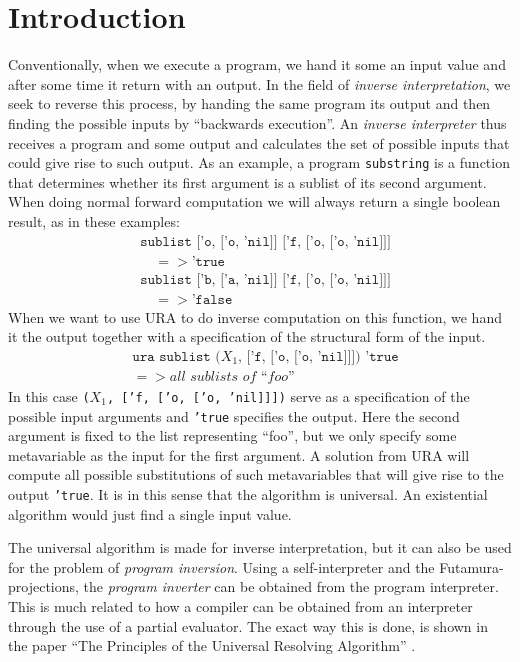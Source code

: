 \documentclass[10pt]{../sigplanconf}
\begin{document}
\newpage
\section{Introduction}
Conventionally, when we execute a program, we hand it some an input
value and after some time it return with an output. In the field of
\textit{inverse interpretation}, we seek to reverse this process, by
handing the same program its output and then finding the possible
inputs by ``backwards execution''. An \textit{inverse interpreter}
thus receives a program and some output and calculates the set of
possible inputs that could give rise to such output. As an example, a
program \texttt{substring} is a function that determines whether its
first argument is a sublist of its second argument. When doing normal
forward computation we will always return a single boolean result, as
in these examples:
\begin{align*}
& \texttt{sublist ['o, ['o, 'nil]] ['f, ['o, ['o, 'nil]]]} \\
& \quad => \texttt{'true} \\
& \texttt{sublist ['b, ['a, 'nil]] ['f, ['o, ['o, 'nil]]]} \\
& \quad => \texttt{'false}
\end{align*}
When we want to use URA to do inverse computation on this function, we
hand it the output together with a specification of the structural
form of the input.
\begin{align*}
  &\texttt{ura sublist ($X_1$, ['f, ['o, ['o, 'nil]]]) 'true} \\
  & => \textit{all sublists of ``foo''}
\end{align*}
In this case \texttt{($X_1$, ['f, ['o, ['o, 'nil]]])} serve as a
specification of the possible input arguments and \texttt{'true}
specifies the output. Here the second argument is fixed to the list
representing ``foo'', but we only specify some metavariable as the
input for the first argument. A solution from URA will compute all
possible substitutions of such metavariables that will give rise to
the output \texttt{'true}. It is in this sense that the algorithm is
universal. An existential algorithm would just find a single input value.

The universal algorithm is made for inverse interpretation, but it can
also be used for the problem of \textit{program inversion}. Using a
self-interpreter and the Futamura-projections, the \textit{program
  inverter} can be obtained from the program interpreter. This is much
related to how a compiler can be obtained from an interpreter through
the use of a partial evaluator. The exact way this is done, is shown
in the paper ``The Principles of the Universal Resolving Algorithm''
\cite{abramov2000universal}.
\end{document}

